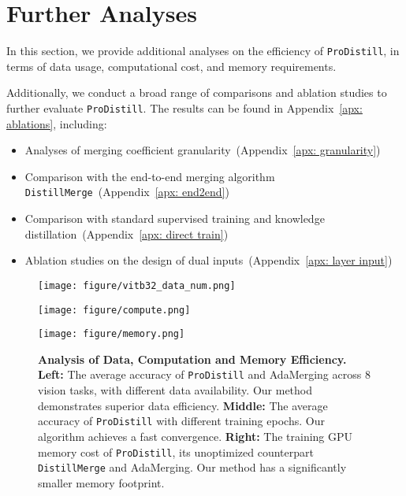 \section{Further Analyses}
\label{sec: efficiency}

In this section, we provide additional analyses on the efficiency of \texttt{ProDistill}, in terms of data usage, computational cost, and memory requirements.

Additionally, we conduct a broad range of comparisons and ablation studies to further evaluate \texttt{ProDistill}.  The results can be found in Appendix~\ref{apx: ablations}, including:

\begin{itemize}[topsep=0em, itemsep=0em]
    \item Analyses of merging coefficient granularity~(Appendix~\ref{apx: granularity})
    \item Comparison with the end-to-end merging algorithm \texttt{DistillMerge}~(Appendix~\ref{apx: end2end})
    \item Comparison with standard supervised training and knowledge distillation~(Appendix~\ref{apx: direct train})
    \item Ablation studies on the design of dual inputs~(Appendix~\ref{apx: layer input}) 
\end{itemize}

\begin{figure*}[t]
    \centering
    \begin{minipage}{0.30\textwidth}
        \centering
        \texttt{[image: figure/vitb32\_data\_num.png]}
    \end{minipage}%
    \hspace{0.0\textwidth} %
    \begin{minipage}{0.30\textwidth}
        \centering
        \texttt{[image: figure/compute.png]}
    \end{minipage}%
    \hspace{0.0\textwidth} %
    \begin{minipage}{0.39\textwidth}
        \centering
        \vspace{4mm}
        \texttt{[image: figure/memory.png]}
    \end{minipage}
    \caption{\textbf{Analysis of Data, Computation and Memory Efficiency.} \textbf{Left:} The average accuracy of \texttt{ProDistill} and AdaMerging across 8 vision tasks, with different data availability. Our method demonstrates superior data efficiency.
    \textbf{Middle:} The average accuracy of \texttt{ProDistill} with different training epochs. Our algorithm achieves a fast convergence. 
    \textbf{Right:} The training GPU memory cost of \texttt{ProDistill}, its unoptimized counterpart \texttt{DistillMerge} and AdaMerging. Our method has a significantly smaller memory footprint. 
    }
\label{fig: data and memory efficiency}
\end{figure*}


